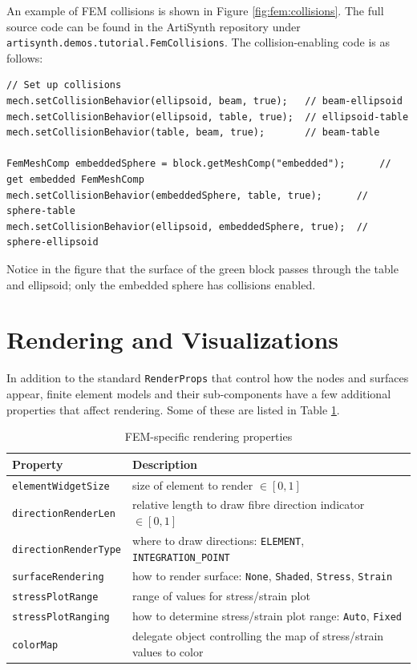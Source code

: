 An example of FEM collisions is shown in Figure \ref{fig:fem:collisions}.
The full source code can be found in the ArtiSynth repository under
{\tt artisynth.demos.tutorial.FemCollisions}.  The collision-enabling
code is as follows:
\begin{lstlisting}[]
// Set up collisions
mech.setCollisionBehavior(ellipsoid, beam, true);   // beam-ellipsoid
mech.setCollisionBehavior(ellipsoid, table, true);  // ellipsoid-table
mech.setCollisionBehavior(table, beam, true);       // beam-table

FemMeshComp embeddedSphere = block.getMeshComp("embedded");      // get embedded FemMeshComp
mech.setCollisionBehavior(embeddedSphere, table, true);      // sphere-table
mech.setCollisionBehavior(ellipsoid, embeddedSphere, true);  // sphere-ellipsoid   
\end{lstlisting}
Notice in the figure that the surface of the green block passes through
the table and ellipsoid; only the embedded sphere has collisions enabled.

\section{Rendering and Visualizations}
\label{sec:fem:rendering}

In addition to the standard {\tt RenderProps} that control how the
nodes and surfaces appear, finite element models and their sub-components
have a few additional properties that affect rendering.  Some of these
are listed in Table \ref{tbl:fem:rendering}.

\begin{table}[ht]
	\centering
	\caption{FEM-specific rendering properties} \label{tbl:fem:rendering}
	\begin{tabular}{lp{}}
		\hline\hline
		Property & Description\\
		\hline
	   {\tt elementWidgetSize} & size of element to render $\in [0,1]$\\
	   {\tt directionRenderLen} & relative length to draw fibre direction indicator $\in [0, 1]$\\
	   {\tt directionRenderType} & where to draw directions: {\tt ELEMENT}, {\tt INTEGRATION\_POINT}\\
	   {\tt surfaceRendering} & how to render surface: {\tt None}, {\tt Shaded}, {\tt Stress}, {\tt Strain}\\
	   {\tt stressPlotRange} & range of values for stress/strain plot\\
	   {\tt stressPlotRanging} & how to determine stress/strain plot range: {\tt Auto}, {\tt Fixed}\\
	   {\tt colorMap} & delegate object controlling the map of stress/strain values to color\\
	   \hline
	\end{tabular}
\end{table}


